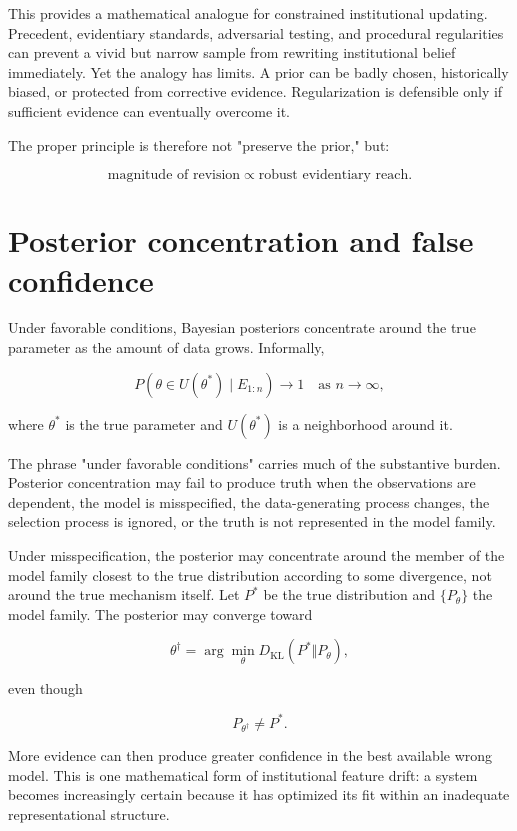 This provides a mathematical analogue for constrained institutional updating. Precedent, evidentiary standards, adversarial testing, and procedural regularities can prevent a vivid but narrow sample from rewriting institutional belief immediately. Yet the analogy has limits. A prior can be badly chosen, historically biased, or protected from corrective evidence. Regularization is defensible only if sufficient evidence can eventually overcome it.

The proper principle is therefore not "preserve the prior," but:

\[
\text{magnitude of revision}
\propto
\text{robust evidentiary reach}.
\]

\section{Posterior concentration and false confidence}
\label{sec:a13}

Under favorable conditions, Bayesian posteriors concentrate around the true parameter as the amount of data grows. Informally,

\[
P\left(
\theta\in U(\theta^\ast)
\mid
E_{1:n}
\right)\to1
\quad\text{as }n\to\infty,
\]

where \(\theta^\ast\) is the true parameter and \(U(\theta^\ast)\) is a neighborhood around it.

The phrase "under favorable conditions" carries much of the substantive burden. Posterior concentration may fail to produce truth when the observations are dependent, the model is misspecified, the data-generating process changes, the selection process is ignored, or the truth is not represented in the model family.

Under misspecification, the posterior may concentrate around the member of the model family closest to the true distribution according to some divergence, not around the true mechanism itself. Let \(P^\ast\) be the true distribution and \(\{P_\theta\}\) the model family. The posterior may converge toward

\[
\theta^\dagger
=
\arg\min_\theta
D_{\mathrm{KL}}(P^\ast\Vert P_\theta),
\]

even though

\[
P_{\theta^\dagger}\neq P^\ast.
\]

More evidence can then produce greater confidence in the best available wrong model. This is one mathematical form of institutional feature drift: a system becomes increasingly certain because it has optimized its fit within an inadequate representational structure.

